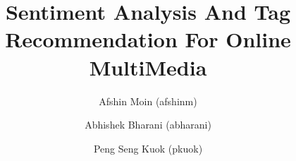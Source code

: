 \documentclass[11pt]{llncs}
\begin{document}
\pagestyle{empty} 
\title{Sentiment Analysis And Tag Recommendation For Online MultiMedia}
\author{Afshin Moin (afshinm)\institute{}
\and
Abhishek Bharani (abharani)\institute{}
\and 
Peng Seng Kuok (pkuok)\institute{}
}

\maketitle







\pagestyle{plain}




\end{document}
